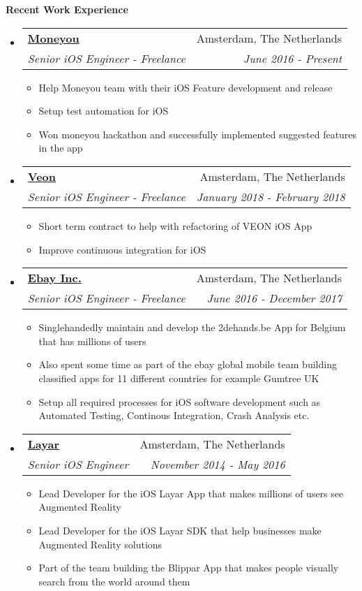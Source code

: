 \documentclass[letterpaper,11pt]{article}
\makeatletter
\newcommand{\resitem}[1]{\item #1 \vspace{-2pt}}
\newcommand{\resheading}[1]{{\large \colorbox{mygrey}{\begin{minipage}{\textwidth}{\textbf{#1 \vphantom{p\^{E}}}}\end{minipage}}}}
\newcommand{\ressubheading}[4]{
\begin{tabular*}{7.0in}{l@{\extracolsep{\fill}}r}
    \textbf{#1} & #2 \\
    \textit{#3} & \textit{#4} \\
\end{tabular*}\vspace{-6pt}}
\makeatother
\begin{document}
\vspace{0.2in}

\resheading{Recent Work Experience}
\begin{itemize}

\item
    \ressubheading{\href{https://www.moneyou.nl/}{Moneyou}}{Amsterdam, The Netherlands}{Senior iOS Engineer - Freelance}{June 2016 - Present}
    \begin{itemize}
        \resitem{Help Moneyou team with their iOS Feature development and release}
        \resitem{Setup test automation for iOS}
         \resitem{Won moneyou hackathon and successfully implemented suggested features in the app}
    \end{itemize}

\item
    \ressubheading{\href{https://veon.com/}{Veon}}{Amsterdam, The Netherlands}{Senior iOS Engineer - Freelance}{January 2018 - February 2018}
    \begin{itemize}
        \resitem{Short term contract to help with refactoring of VEON iOS App}
        \resitem{Improve continuous integration for iOS}
    \end{itemize}


\item
    \ressubheading{\href{https://www.ebay.com/}{Ebay Inc.}}{Amsterdam, The Netherlands}{Senior iOS Engineer - Freelance}{June 2016 - December 2017}
    \begin{itemize}
        \resitem{Singlehandedly maintain and develop the 2dehands.be App for Belgium that has millions of users}
        \resitem{Also spent some time as part of the ebay global mobile team building classified apps for 11 different countries for example Gumtree UK}
         \resitem{Setup all required processes for iOS software development such as Automated Testing, Continous Integration, Crash Analysis etc.}
    \end{itemize}

\item
    \ressubheading{\href{https://www.layar.com/}{Layar}}{Amsterdam, The Netherlands}{Senior iOS Engineer}{November 2014 - May 2016}
    \begin{itemize}
        \resitem{Lead Developer for the iOS Layar App that makes millions of users see Augmented Reality}
        \resitem{Lead Developer for the iOS Layar SDK that help businesses make Augmented Reality solutions}
        \resitem{Part of the team building the Blippar App that makes people visually search from the world around them}
    \end{itemize}


\end{itemize}
\end{document}
